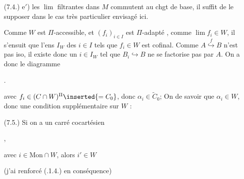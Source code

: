 

(7.4.) e$'$) les \uline{$\lim$} filtrantes dans $M$ commutent au chgt de base, il suffit  de le supposer dans le cas très particulier  envisagé ici. \unsure{//}

Comme  $W$ est $\Pi$-accessible, et $(f_i)_{i\in I}$ est $\Pi$-adapté , comme $\lim f_i\in W$, il s'ensuit que l'ens  $I_W$ des $i\in I$ tels que $f_i\in W$ est cofinal. Comme $A\overset{f}{\hookrightarrow}B$ n'est pas iso, il existe donc un $i\in I_W$ tel que $B_i\hookrightarrow B$ ne se factorise pas par $A$. On a donc le diagramme

.

 avec $f_i\in(C\cap W)^\Pi\inserted{=C_0}$, donc $\alpha_i\in\widetilde C_0$;  On   de savoir que $\alpha_i\in W$, donc une condition supplémentaire sur $W$ :

(7.5.) Si on a un carré cocartésien

\hfill,

avec $i\in\mathrm{Mon}\cap W$, alors $i'\in W$


(j'ai renforcé (.1.4.) en conséquence)
